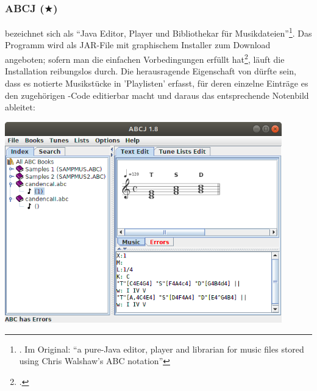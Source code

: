 %
%
%



\subsubsection{ABCJ ($\bigstar$)}

\label{ABCJ} bezeichnet sich als \enquote{Java Editor, Player und
Bibliothekar für Musikdateien}\footnote{\cite[vgl.][\nopage wp.]{Spencer2019a}.
Im Original: \enquote{a pure-Java editor, player and librarian for music files
stored using Chris Walshaw's ABC notation}}. Das Programm wird als JAR-File mit
graphischem Installer zum Download angeboten; sofern man die einfachen
Vorbedingungen erfüllt hat\footcite[vgl.][\nopage wp]{Spencer2019a}, läuft die
Installation reibungslos durch. Die herausragende Eigenschaft von 
dürfte sein, dass es  notierte Musikstücke in 'Playlisten' erfasst, für
deren einzelne Einträge es den zugehörigen -Code editierbar macht und
daraus  das entsprechende Notenbild ableitet:

\begin{center}
\includegraphics[width=0.9\textwidth]{frontends/abcj/abcj-cadenca1-300dpi.png}
\end{center}

